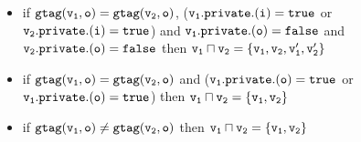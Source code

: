 \begin{itemize}
\begin{itemize}
    
   \item if $\tt gtag(v_1, o) = gtag(v_2, o)$, ($\tt v_1.private.(i) = true$ or $\tt v_2.private.(i) = true$) and $\tt v_1.private.(o) = false$ and $\tt v_2.private.(o) = false$ then  $\tt v_1 \sqcap v_2 = \{v_1,v_2,v_1',v_2'\}$  

  \item if $\tt gtag(v_1, o) = gtag(v_2, o)$ and ($\tt v_1.private.(o) = true$ or $\tt v_1.private.(o) = true$) then  $\tt v_1 \sqcap v_2 = \{v_1,v_2\}$ 

    \item if $\tt gtag(v_1, o) \neq gtag(v_2, o)$ then $\tt v_1 \sqcap v_2 = \{v_1,v_2\}$
 \end{itemize}
 
 \end{itemize}


%
% 
% 
